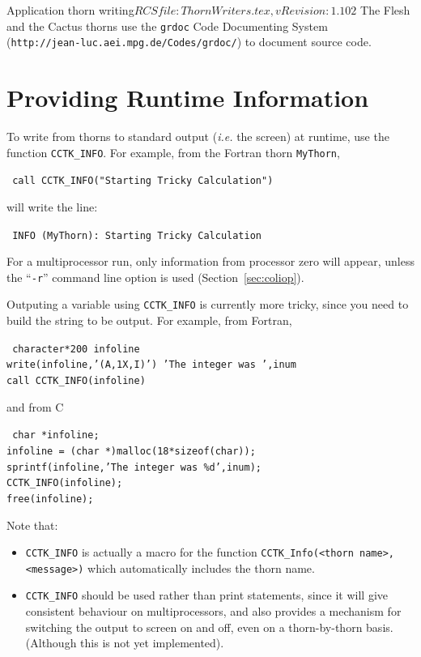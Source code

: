 \begin{cactuspart}{2}{Application thorn writing}{$RCSfile: ThornWriters.tex,v $}{$Revision: 1.102 $}
The Flesh and the Cactus thorns use the {\tt grdoc} Code Documenting
System\\(\texttt{http://jean-luc.aei.mpg.de/Codes/grdoc/}) to document
source code.


\section{Providing Runtime Information}
\label{sec:prrutiin}

To write from thorns to standard output ({\it i.e.} the screen)
at runtime, use the function {\tt CCTK\_INFO}.
For example, from the Fortran thorn {\tt MyThorn},

{\tt
call CCTK\_INFO("Starting Tricky Calculation")
}

will write the line:

{\tt
INFO (MyThorn): Starting Tricky Calculation
}

For a multiprocessor run, only information from processor zero
will appear, unless the ``{\tt -r}'' command line option is used
(Section~\ref{sec:coliop}).

Outputing a variable using {\tt CCTK\_INFO} is currently more tricky,
since you need to build the string to be output. For example, from Fortran,

{\tt
character*200 infoline\\
write(infoline,'(A,1X,I)') 'The integer was ',inum\\
call CCTK\_INFO(infoline)
}

and from C

{\tt
char *infoline;\\
infoline = (char *)malloc(18*sizeof(char));\\
sprintf(infoline,'The integer was \%d',inum);\\
CCTK\_INFO(infoline);\\
free(infoline);
}

Note that:
\begin{itemize}
\item{} {\tt CCTK\_INFO} is actually a macro for the function
        {\tt CCTK\_Info(<thorn name>,<message>)} which automatically
        includes the thorn name.

\item{} {\tt CCTK\_INFO} should be used rather than print statements,
       since it will give consistent behaviour on multiprocessors, and
       also provides a mechanism for switching the output to screen on
       and off, even on a thorn-by-thorn basis. (Although this is
       not yet implemented).


\end{itemize}
\end{cactuspart}
